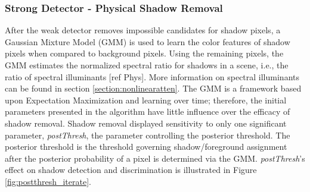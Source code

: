 \documentclass[12pt]{report}
\begin{document}
\subsubsection{Strong Detector - Physical Shadow Removal}

After the weak detector removes impossible candidates for shadow pixels, a Gaussian Mixture Model (GMM) is used to learn the color features of shadow pixels when compared to background pixels. Using the remaining pixels, the GMM estimates the normalized spectral ratio for shadows in a scene, i.e., the ratio of spectral illuminants [ref Phys]. More information on spectral illuminants can be found in section \ref{section:nonlinearatten}. The GMM is a framework based upon Expectation Maximization and learning over time; therefore, the initial parameters presented in the algorithm have little influence over the efficacy of shadow removal. Shadow removal displayed sensitivity to only one significant parameter, \textit{postThresh}, the parameter controlling the posterior threshold. The posterior threshold is the threshold governing shadow/foreground assignment after the posterior probability of a pixel is determined via the GMM. \textit{postThresh}'s effect on shadow detection and discrimination is illustrated in Figure \ref{fig:postthresh_iterate}.
\end{document}
